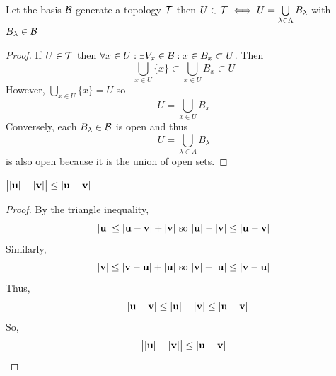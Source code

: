 \documentclass[12pt]{extarticle}
\begin{document}
\begin{lemma} \label{baisunion}
Let the basis $\base$ generate a topology $\topo$ then $U \in \topo \iff U = \bigcup\limits_{\lambda \in \Lambda} B_\lambda$ with $B_\lambda \in \base$
\end{lemma}

\begin{proof}
If $U \in \topo$ then $\forall x \in U : \exists V_x \in \base : x \in B_x \subset U$. Then \[\bigcup\limits_{x \in U} \{x \} \subset \bigcup\limits_{x \in U} B_x \subset U\]
However, $\bigcup\limits_{x \in U} \{x\} = U$ so \[U =  \bigcup\limits_{x \in U} B_x\]
Conversely, each $B_\lambda \in \base$ is open and thus \[U = \bigcup\limits_{\lambda \in \Lambda} B_\lambda \]
is also open because it is the union of open sets.
\end{proof}

\begin{lemma} \label{subineq}
$\big| |\bf{u}| - |\bf{v}| \big| \le |\bf{u} - \bf{v}|$
\end{lemma}

\begin{proof}
By the triangle inequality, \[|\bf{u}| \le |\bf{u} - \bf{v}| + |\bf{v}| \text{ so }|\bf{u}| - |\bf{v}| \le |\bf{u} - \bf{v}|\] Similarly, \[ |\bf{v}| \le |\bf{v} - \bf{u}| + |\bf{u}| \text{ so } |\bf{v}| - |\bf{u}| \le |\bf{v} - \bf{u}|\]
Thus, \[ -|\bf{u} - \bf{v}| \le |\bf{u}| - |\bf{v}| \le |\bf{u} - \bf{v}| \]
So, \[ \big| |\bf{u}| - |\bf{v}| \big| \le |\bf{u} - \bf{v}|\]
\end{proof}
\end{document}

